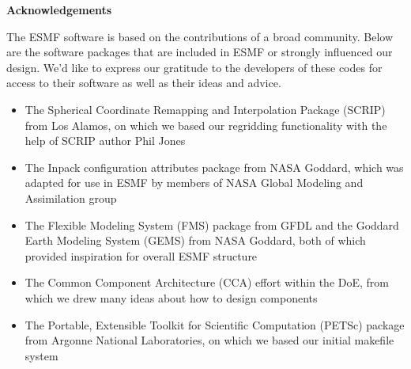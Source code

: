 
\vspace{2in}
\begin{center}
{\bf Acknowledgements}
\end{center}

The ESMF software is based on the contributions of a broad community.
Below are the software packages that are included in ESMF or strongly 
influenced our design.  We'd like to express our gratitude to the 
developers of these codes for access to their software as well as their 
ideas and advice.

\begin{itemize}

\item The Spherical Coordinate Remapping and Interpolation Package (SCRIP) 
from Los Alamos, on which we based our regridding functionality with the
help of SCRIP author Phil Jones

\item The Inpack configuration attributes package from NASA Goddard, 
which was adapted for use in ESMF by members of NASA Global Modeling and 
Assimilation group

\item The Flexible Modeling System (FMS) package from GFDL and the 
Goddard Earth Modeling System (GEMS) from NASA Goddard, both of which 
provided inspiration for overall ESMF structure

\item The Common Component Architecture (CCA) effort within the DoE,
from which we drew many ideas about how to design components

\item The Portable, Extensible Toolkit for Scientific Computation (PETSc) 
package from Argonne National Laboratories, on which we 
based our initial makefile system

\end{itemize}